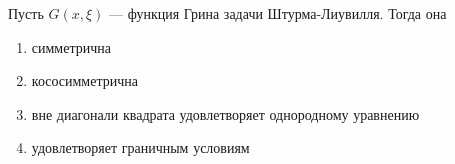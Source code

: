 Пусть \(G\left(x,\xi \right)\) — функция Грина задачи Штурма-Лиувилля. Тогда она

\begin{enumerate}[label=\arabic*)]
    \item симметрична
    \item кососимметрична
    \item вне диагонали квадрата удовлетворяет однородному уравнению
    \item удовлетворяет граничным условиям
\end{enumerate}

